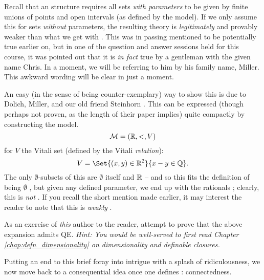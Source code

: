 \begin{remark}
  Recall that an \om structure requires all  sets \emph{with parameters} to be given by finite unions of points and open intervals (as defined by the model). If we only assume this for sets  \emph{without} parameters, the resulting theory is \emph{legitimately} and provably weaker than what we get with \omy. This was in passing mentioned to be potentially true earlier on, but in one of the question and answer sessions held for this course, it was pointed out that it is \emph{in fact} true by a gentleman with the given name Chris. In a moment, we will be referring to him by his family name, Miller. This awkward wording will be clear in just a moment.

  An easy (in the sense of being counter-exemplary) way to show this is due to Dolich, Miller, and our old friend Steinhorn \cite{dolich_structures_2009}. This can be expressed (though perhaps not proven, as the length of their paper implies) quite compactly by constructing the model.
  $$
    \mathcal{M} = (\mathbb{R}, <, V)
  $$
  for $V$ the Vitali set (defined by the Vitali \emph{relation}):
  $$
    V = \Set{(x, y) \in \R^2}{x - y \in \Q}.
  $$
  The only $\emptyset$- subsets of this are $\emptyset$ itself and $\mathbb{R}$ -- and so this fits the definition of being $\emptyset$ \om, but given any defined parameter, we end up with the rationals ; clearly, this is \emph{not} \om. If you recall the short mention made earlier, it may interest the reader to note that this is \emph{weakly} \om.

  \begin{exercise}
    As an exercise of \emph{this} author to the reader, attempt to prove that the above expansion admits QE. \textit{Hint: You would be well-served to first read Chapter \ref{chap:defn_dimensionality} on dimensionality and definable closures.}
  \end{exercise}
\end{remark}

Putting an end to this brief foray into intrigue with a splash of ridiculousness, we now move back to a consequential idea once one defines \cds: connectedness.


